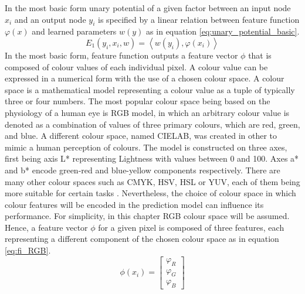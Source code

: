 In the most basic form unary potential of a given factor between an input node $x_i$ and an output node $y_i$ is specified by a linear relation between feature function $\varphi(x)$ and learned parameters $w(y)$ \cite{Nowozin} as in equation \ref{eq:unary_potential_basic}.
\begin{equation}
    \label{eq:unary_potential_basic}
    E_1(y_i,x_i,w) =  \left \langle w(y_i), \varphi(x_i) \right \rangle 
\end{equation}
In the most basic form, feature function outputs a feature vector $\phi$ that is composed of colour values of each individual pixel. A colour value can be expressed in a numerical form with the use of a chosen colour space. A colour space is a mathematical model representing a colour value as a tuple of typically three or four numbers. The most popular colour space being based on the physiology of a human eye is RGB model, in which an arbitrary colour value is denoted as a combination of values of three primary colours, which are red, green, and blue. A different colour space, named CIELAB, was created in other to mimic a human perception of colours. The model is constructed on three axes, first being axis L* representing Lightness with values between 0 and 100. Axes a* and b* encode green-red and blue-yellow components respectively. There are many other colour spaces such as CMYK, HSV, HSL or YUV, each of them being more suitable for certain tasks \cite{colour_space}. Nevertheless, the choice of colour space in which colour features will be encoded in the prediction model can influence its performance. For simplicity, in this chapter RGB colour space will be assumed. Hence, a feature vector $\phi$ for a given pixel is composed of three features, each representing a different component of the chosen colour space as in equation \ref{eq:fi_RGB}.
\begin{equation}
    \label{eq:fi_RGB}
    \phi(x_i) = \begin{bmatrix}
        \varphi_R\\ 
        \varphi_G\\ 
        \varphi_B
    \end{bmatrix}
\end{equation}

